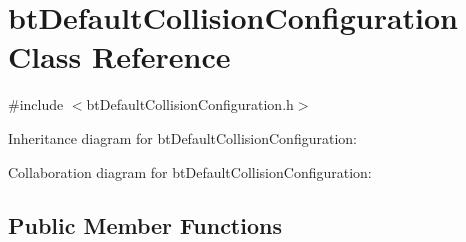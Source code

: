 \hypertarget{classbt_default_collision_configuration}{\section{bt\+Default\+Collision\+Configuration Class Reference}
\label{classbt_default_collision_configuration}
}


{\ttfamily \#include $<$bt\+Default\+Collision\+Configuration.\+h$>$}



Inheritance diagram for bt\+Default\+Collision\+Configuration\+:


Collaboration diagram for bt\+Default\+Collision\+Configuration\+:
\subsection*{Public Member Functions}
